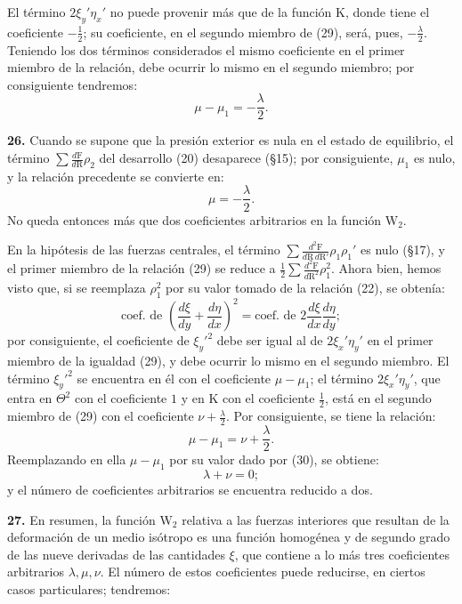 El término $2\xi_y'\eta_x'$ no puede provenir más que
de la función $\mathrm{K}$, donde tiene el coeficiente $-\tfrac12$; su
coeficiente, en el segundo miembro de (29), será, pues, $-\tfrac{\lambda}{2}$.
Teniendo los dos términos considerados el mismo coeficiente en el primer
miembro de la relación, debe ocurrir lo mismo en el segundo miembro; por
consiguiente tendremos:
\begin{equation}
\mu-\mu_1=-\frac{\lambda}{2}.
\tag{30}
\end{equation}

\noindent\textbf{26.} Cuando se supone que la presión exterior es nula en el estado de
equilibrio, el término $\displaystyle\sum\frac{d\mathrm{F}}{d\mathrm{R}}\rho_2$
del desarrollo (20) desaparece (§15); por consiguiente, $\mu_1$ es nulo, y
la relación precedente se convierte en:
\begin{equation}
\mu=-\frac{\lambda}{2}.
\tag{31}
\end{equation}
No queda entonces más que dos coeficientes arbitrarios en la función
$\mathrm{W}_2$.

En la hipótesis de las fuerzas centrales, el término
$\displaystyle\sum\frac{d^2\mathrm{F}}{d\mathrm{R}\,d\mathrm{R}'}\rho_1\rho_1'$
es nulo (§17), y el primer miembro de la relación (29) se reduce a
$\tfrac12\displaystyle\sum\frac{d^2\mathrm{F}}{d\mathrm{R}^2}\rho_1^2$.
Ahora bien, hemos visto que, si se reemplaza $\rho_1^2$ por su valor
tomado de la relación (22), se obtenía:
\[
\text{coef. de }\left(\frac{d\xi}{dy}+\frac{d\eta}{dx}\right)^2
=\text{coef. de }2\frac{d\xi}{dx}\frac{d\eta}{dy};
\]
por consiguiente, el coeficiente de $\xi_y'^2$ debe ser igual al de
$2\xi_x'\eta_y'$ en el primer miembro de la igualdad (29), y debe ocurrir
lo mismo en el segundo miembro. El término $\xi_y'^2$ se encuentra en él
con el coeficiente $\mu-\mu_1$; el término $2\xi_x'\eta_y'$, que entra en
$\Theta^2$ con el coeficiente $1$ y en $\mathrm{K}$ con el coeficiente
$\tfrac12$, está en el segundo miembro de (29) con el coeficiente
$\nu+\tfrac{\lambda}{2}$. Por consiguiente, se tiene la relación:
\[
\mu-\mu_1=\nu+\frac{\lambda}{2}.
\]
Reemplazando en ella $\mu-\mu_1$ por su valor dado por (30), se obtiene:
\begin{equation}
\lambda+\nu=0;
\tag{32}
\end{equation}
y el número de coeficientes arbitrarios se encuentra reducido a dos.

\noindent\textbf{27.} En resumen, la función $\mathrm{W}_2$ relativa a las
fuerzas interiores que resultan de la deformación de un medio isótropo es
una función homogénea y de segundo grado de las nueve derivadas de las
cantidades $\xi$, que contiene a lo más tres coeficientes arbitrarios
$\lambda,\mu,\nu$. El número de estos coeficientes puede reducirse, en
ciertos casos particulares; tendremos:

